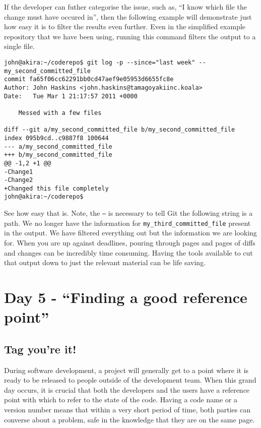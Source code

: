 If the developer can futher categorise the issue, such as, ``I know which file the change must have occured in'', then the following example will demonstrate just how easy it is to filter the results even further.  Even in the simplified example repository that we have been using, running this command filters the output to a single file.

\begin{Verbatim}[frame=leftline,framerule=1mm,fontsize=\relsize{-3}] 
john@akira:~/coderepo$ git log -p --since="last week" -- 
my_second_committed_file
commit fa65f06cc62291bb0cd47aef9e05953d6655fc8e
Author: John Haskins <john.haskins@tamagoyakiinc.koala>
Date:   Tue Mar 1 21:17:57 2011 +0000

    Messed with a few files

diff --git a/my_second_committed_file b/my_second_committed_file
index 095b9cd..c9887f8 100644
--- a/my_second_committed_file
+++ b/my_second_committed_file
@@ -1,2 +1 @@
-Change1
-Change2
+Changed this file completely
john@akira:~/coderepo$ 
\end{Verbatim}

See how easy that is.  Note, the \texttt{--} is necessary to tell Git the following string is a path.  We no longer have the information for \texttt{my\_third\_committed\_file} present in the output.  We have filtered everything out but the information we are looking for.  When you are up against deadlines, pouring through pages and pages of diffs and changes can be incredibly time consuming.  Having the tools available to cut that output down to just the relevant material can be life saving.

\section{Day 5 - ``Finding a good reference point''}
\subsection{Tag you're it!}

During software development, a project will generally get to a point where it is ready to be released to people outside of the development team.  When this grand day occurs, it is crucial that both the developers and the users have a reference point with which to refer to the state of the code.  Having a code name or a version number means that within a very short period of time, both parties can converse about a problem, safe in the knowledge that they are on the same page.

